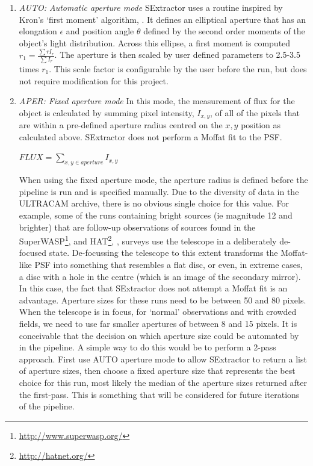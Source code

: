 \begin{enumerate}
  \item \emph{AUTO: Automatic aperture mode}
SExtractor uses a routine inspired by Kron's `first moment' algorithm, \citep{kron}. It defines an elliptical aperture that has an elongation $\epsilon$ and position angle $\theta$ defined by the second order moments of the object's light distribution. Across this ellipse, a first moment is computed $r_1 = \frac{\sum r I_r}{\sum{I_r}}$. The aperture is then scaled by user defined parameters to 2.5-3.5 times $r_1$. This scale factor is configurable by the user before the run, but does not require modification for this project. 

  \item \emph{APER: Fixed aperture mode}
In this mode, the measurement of flux for the object is calculated by summing pixel intensity, $I_{x,y}$,  of all of the pixels that are within a pre-defined aperture radius centred on the $x, y$ position as calculated above. SExtractor does not perform a Moffat fit to the PSF. 

$FLUX = \sum\limits_{x,y \in aperture}I_{x,y} $

When using the fixed aperture mode, the aperture radius is defined before the pipeline is run and is specified manually. Due to the diversity of data in the ULTRACAM archive, there is no obvious single choice for this value. For example, some of the runs containing bright sources (ie magnitude 12 and brighter) that are follow-up observations of sources found in the {SuperWASP}\footnote{\url{http://www.superwasp.org/}}, \citep{PollaccoSuperWASP} and {HAT}\footnote{\url{http://hatnet.org/}}, \citep{BakosHATNet}, surveys use the telescope in a deliberately de-focused state. De-focussing the telescope to this extent transforms the Moffat-like PSF into something that resembles a flat disc, or even, in extreme cases, a disc with a hole in the centre (which is an image of the secondary mirror). In this case, the fact that SExtractor does not attempt a Moffat fit is an advantage. Aperture sizes for these runs need to be between 50 and 80 pixels. When the telescope is in focus, for `normal' observations and with crowded fields, we need to use far smaller apertures of between 8 and 15 pixels. It is conceivable that the decision on which aperture size could be automated by in the pipeline. A simple way to do this would be to perform a 2-pass approach. First use AUTO aperture mode to allow SExtractor to return a list of aperture sizes, then choose a fixed aperture size that represents the best choice for this run, most likely the median of the aperture sizes returned after the first-pass. This is something that will be considered for future iterations of the pipeline. 


\end{enumerate}
